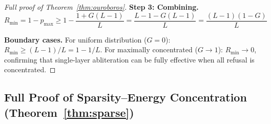 \begin{proof}[Full proof of Theorem~\ref{thm:ouroboros}]
\textbf{Step 3: Combining.}
\begin{equation}
    R_{\min} = 1 - p_{\max} \geq 1 - \frac{1 + G(L-1)}{L} = \frac{L - 1 - G(L-1)}{L} = \frac{(L-1)(1-G)}{L}
\end{equation}

\textbf{Boundary cases.}
For uniform distribution ($G = 0$): $R_{\min} \geq (L-1)/L = 1 - 1/L$.
For maximally concentrated ($G \to 1$): $R_{\min} \to 0$, confirming that single-layer abliteration can be fully effective when all refusal is concentrated.
\end{proof}

\subsection{Full Proof of Sparsity--Energy Concentration (Theorem~\ref{thm:sparse})}
\label{app:sparse_proof}

